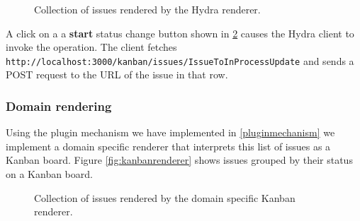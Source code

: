 \begin{figure}[!htb]
  \caption{Collection of issues rendered by the Hydra renderer.}
  \label{fig:issueshydra}
\end{figure}

A click on a a \textbf{start} status change button shown in \ref{fig:issueshydra} causes the Hydra client to invoke the operation. The client fetches \lstinline{http://localhost:3000/kanban/issues/IssueToInProcessUpdate} and sends a POST request to the URL of the issue in that row.

\subsubsection{Domain rendering}
Using the plugin mechanism we have implemented in \ref{pluginmechanism} we implement a domain specific renderer that interprets this list of issues as a Kanban board. Figure \ref{fig:kanbanrenderer} shows issues grouped by their status on a Kanban board.

\begin{figure}[!htb]
  \caption{Collection of issues rendered by the domain specific Kanban renderer.}
  \label{fig:issueshydra}
\end{figure}

